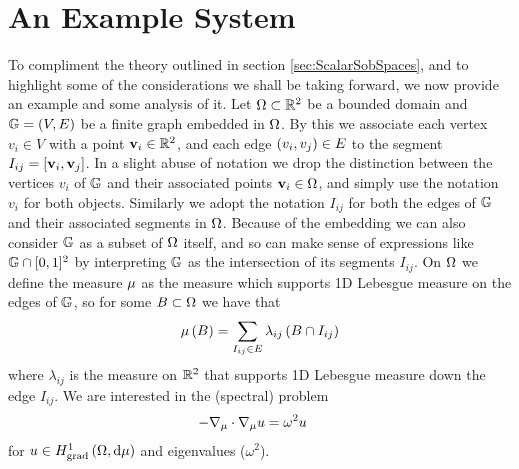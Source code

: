 \section{An Example System} \label{sec:ScalarExample}
To compliment the theory outlined in section \ref{sec:ScalarSobSpaces}, and to highlight some of the considerations we shall be taking forward, we now provide an example and some analysis of it.
Let $\Omega\subset\mathbb{R}^2$ be a bounded domain and $\mathbb{G} = \left( V,E \right)$ be a finite graph embedded in $\Omega$. 
By this we associate each vertex $v_i\in V$ with a point $\mathbf{v}_i\in\mathbb{R}^2$, and each edge $\left( v_i,v_j \right)\in E$ to the segment $I_{ij}=\left[ \mathbf{v}_i,\mathbf{v}_j \right]$.
In a slight abuse of notation we drop the distinction between the vertices $v_i$ of $\mathbb{G}$ and their associated points $\mathbf{v}_i\in\Omega$, and simply use the notation $v_i$ for both objects.
Similarly we adopt the notation $I_{ij}$ for both the edges of $\mathbb{G}$ and their associated segments in $\Omega$.
Because of the embedding we can also consider $\mathbb{G}$ as a subset of $\Omega$ itself, and so can make sense of expressions like $\mathbb{G}\cap[0,1]^2$ by interpreting $\mathbb{G}$ as the intersection of its segments $I_{ij}$. 
On $\Omega$ we define the measure $\mu$ as the measure which supports 1D Lebesgue measure on the edges of $\mathbb{G}$, so for some $B\subset\Omega$ we have that 
\begin{align*}
	\mu\left( B \right) = \sum_{I_{ij}\in E}\lambda_{ij}\left( B \cap I_{ij} \right)
\end{align*}
where $\lambda_{ij}$ is the measure on $\mathbb{R}^2$ that supports 1D Lebesgue measure down the edge $I_{ij}$. 
We are interested in the (spectral) problem
\begin{align} \label{eq:ScalarExampleStrongForm}
	-\nabla_\mu \cdot \nabla_\mu u &= \omega^2 u
\end{align}
for $u\in H^1_\mathrm{grad}\left( \Omega, \mathrm{d}\mu \right)$ and eigenvalues ($\omega^2$).

